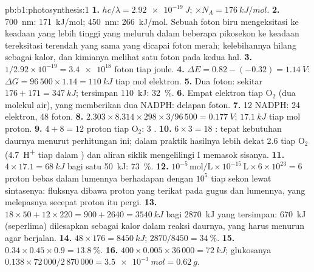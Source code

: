 \begin{solution}{pb:b1:photosynthesis:1}
\textbf{1.} $hc/\lambda = \qty{2.92e-19}{J}$; $\times N_A = \qty{176}{kJ/mol}$.
\textbf{2.} \qty{700}{nm}: \qty{171}{kJ/mol}; \qty{450}{nm}:
\qty{266}{kJ/mol}. Sebuah foton biru mengeksitasi  ke keadaan
yang lebih tinggi yang meluruh dalam beberapa pikosekon ke keadaan
tereksitasi terendah yang sama yang dicapai foton merah; kelebihannya
hilang sebagai kalor, dan kimianya melihat satu foton pada kedua hal.
\textbf{3.} $1/2.92\times 10^{-19} = \num{3.4e18}$ foton tiap joule.
\textbf{4.} $\Delta E = 0.82 - (-0.32) = \qty{1.14}{V}$: $\Delta G =
96\,500\times 1.14 = \qty{110}{kJ}$ tiap mol elektron.
\textbf{5.} Dua foton: sekitar $176 + 171 = \qty{347}{kJ}$; tersimpan
\qty{110}{kJ}: \qty{32}{\%}.
\textbf{6.} Empat elektron tiap $\mathrm{O_2}$ (dua molekul air), yang
memberikan dua NADPH: delapan foton.
\textbf{7.} 12 NADPH: 24 elektron, 48 foton.
\textbf{8.} $2.303\times 8.314\times 298\times 3/96\,500 = \qty{0.177}{V}$;
$\qty{17.1}{kJ}$ tiap mol proton.
\textbf{9.} $4 + 8 = 12$ proton tiap $\mathrm{O_2}$: 3 .
\textbf{10.} $6\times 3 = 18$ : tepat kebutuhan daurnya menurut
perhitungan ini; dalam praktik hasilnya lebih dekat 2.6 tiap
$\mathrm{O_2}$ (\qty{4.7}{H^+} tiap  dalam ) dan aliran
siklik mengelilingi  I memasok sisanya.
\textbf{11.} $4\times 17.1 = \qty{68}{kJ}$ bagi satu  \qty{50}{kJ}:
\qty{73}{\%}.
\textbf{12.} $10^{-5}\,\mathrm{mol/L}\times 10^{-15}\,\mathrm{L}\times
6\times 10^{23} = 6$ proton bebas dalam lumennya berhadapan dengan
$10^5$ tiap sekon lewat sintasenya: fluksnya dibawa proton yang terikat
pada gugus   dan  lumennya, yang melepasnya
secepat proton itu pergi.
\textbf{13.} $18\times 50 + 12\times 220 = 900 + 2640 = \qty{3540}{kJ}$
bagi \qty{2870}{kJ} yang tersimpan: \qty{670}{kJ} (seperlima) dilesapkan
sebagai kalor dalam reaksi daurnya, yang harus menurun agar berjalan.
\textbf{14.} $48\times 176 = \qty{8450}{kJ}$; $2870/8450 = \qty{34}{\%}$.
\textbf{15.} $0.34\times 0.45\times 0.9 = \qty{13.8}{\%}$.
\textbf{16.} $400\times 0.005\times 36\,000 = \qty{72}{kJ}$; glukosanya
$0.138\times 72\,000/2\,870\,000 = \qty{3.5e-3}{mol} = \qty{0.62}{g}$.

\end{solution}

